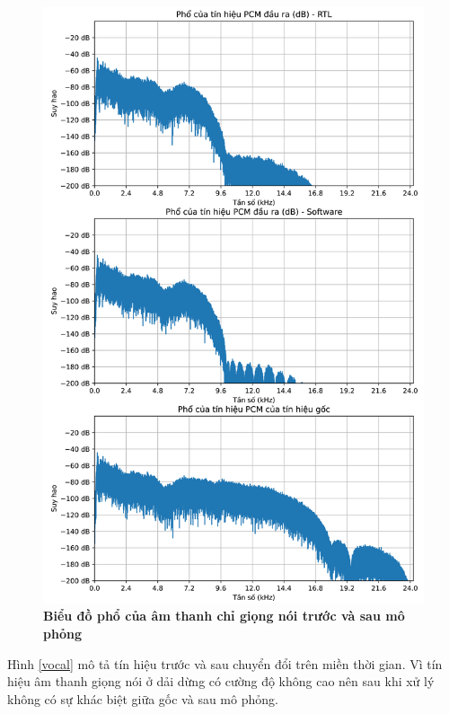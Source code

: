 \begin{figure}[H]
    \centering
    \includegraphics[width=13cm]{Images/Chuong4/tb/wav/vocal_psd.png}
    \caption[Biểu đồ phổ của âm thanh chỉ giọng nói trước và sau mô phỏng]{\bfseries \fontsize{12pt}{0pt}\selectfont  Biểu đồ phổ của âm thanh chỉ giọng nói trước và sau mô phỏng}
    \label{vocal_psd}
\end{figure}

Hình \ref{vocal} mô tả tín hiệu trước và sau chuyển đổi trên miền thời gian. Vì tín hiệu âm thanh giọng nói ở dải dừng có cường độ không cao nên sau khi xử lý không có sự khác biệt giữa gốc và sau mô phỏng.

